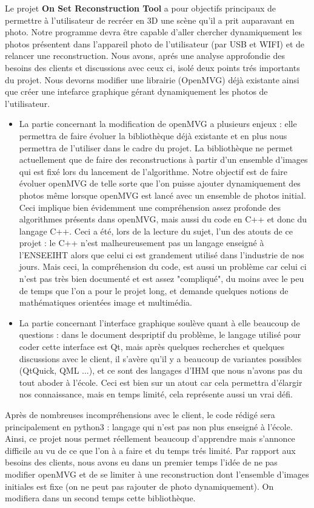 Le projet \textbf{On Set Reconstruction Tool} a pour objectifs principaux de permettre à l'utilisateur de recréer en 3D une scène qu'il a prit auparavant en photo. 
Notre programme devra être capable d'aller chercher dynamiquement les photos présentent dans l'appareil photo de l'utilisateur (par USB et WIFI) et de relancer
une reconstruction. Nous avons, aprés une analyse approfondie des besoins des clients et discussions avec ceux ci, isolé deux points trés importants du projet.
Nous devorns modifier une librairie (OpenMVG) déjà 
existante ainsi que créer une intefarce graphique gérant dynamiquement les photos de l'utilisateur.\\
\begin{itemize}
\item La partie concernant la modification de openMVG a plusieurs enjeux : elle permettra de faire évoluer la bibliothèque déjà existante et en plus 
nous permettra de l'utiliser dans le cadre du projet. La bibliothèque ne permet actuellement que de faire des reconstructions à partir d'un ensemble 
d'images qui est fixé lors du lancement de l'algorithme. Notre objectif est de faire évoluer openMVG de telle sorte que l'on puisse
ajouter dynamiquement des photos même lorsque openMVG est lancé avec un ensemble de photos initial. Ceci implique bien évidemment
une compréhension assez profonde des algorithmes présents dans openMVG, mais aussi du code en C++ et donc du langage C++. Ceci a été,
lors de la lecture du sujet, l'un des atouts de ce projet : le C++ n'est malheureusement pas un langage enseigné à l'ENSEEIHT alors que 
celui ci est grandement utilisé dans l'industrie de nos jours. Mais ceci, la compréhension du code, est aussi un problème car
celui ci n'est pas très bien documenté et est assez "compliqué", du moins avec le peu de temps que l'on a pour le projet long, et demande
quelques notions de mathématiques orientées image et multimédia. \\
\item La partie concernant l'interface graphique soulève quant à elle beaucoup de questions : dans le document despriptif du problème, 
le langage utilisé pour coder cette interface est Qt, mais après quelques recherches et quelques discussions avec le client, il s'avère qu'il
y a beaucoup de variantes possibles (QtQuick, QML ...), et ce sont des langages d'IHM que nous n'avons pas du tout aboder à l'école. Ceci est
bien sur un atout car cela permettra d'élargir nos connaissance, mais en temps limité, cela représente aussi un vrai défi. \\
\end{itemize}

Après de nombreuses incompréhensions avec le client, le code rédigé sera principalement en python3 : langage qui n'est pas non plus
enseigné à l'école. Ainsi, ce projet nous permet réellement beaucoup d'apprendre mais s'annonce difficile au vu de ce que l'on à a faire
et du temps trés limité. Par rapport aux besoins des clients, nous avons eu dans un premier temps l'idée de ne pas modifier 
openMVG et de se limiter à une reconstruction dont l'ensemble d'images initiales est fixe (on ne peut pas rajouter de photo dynamiquement). 
On modifiera dans un second temps cette bibliothèque.